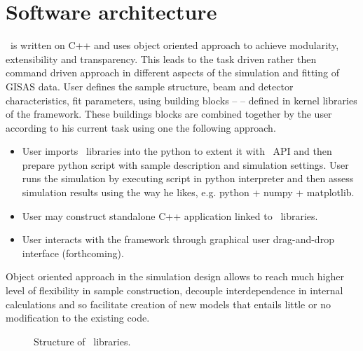 \newpage
\chapter{Software architecture}
 

\BornAgain\ is written on C++
and uses object oriented approach to 
achieve modularity, extensibility and transparency.
This leads to the task driven rather then command driven approach in 
different aspects  of the simulation and fitting of GISAS data.
User defines the sample structure, beam and detector characteristics,
fit parameters, using building
blocks --  -- defined in kernel libraries of the framework.
These buildings blocks are combined together by the user according to his current
task using one the following approach.
\begin{itemize}
\item User imports \BornAgain\ libraries into the python to extent it
with \BornAgain\ API and then prepare python script with sample description and simulation settings. 
User runs the simulation by executing script in python interpreter and then assess
simulation results using the way he likes, e.g. python + numpy + matplotlib.
\item User may construct standalone C++ application linked to \BornAgain\ libraries.
\item User interacts with the framework through graphical 
user drag-and-drop interface (forthcoming).
\end{itemize}

Object oriented approach in the simulation design allows 
to reach much higher level of flexibility in sample construction, 
decouple interdependence in internal calculations and so facilitate creation of new models
that entails little or no modification to the existing code. 


\begin{figure}[htbp]
\centering
\caption{
Structure of \BornAgain\ libraries.
}
\label{fig:two_ratios}
\end{figure}


